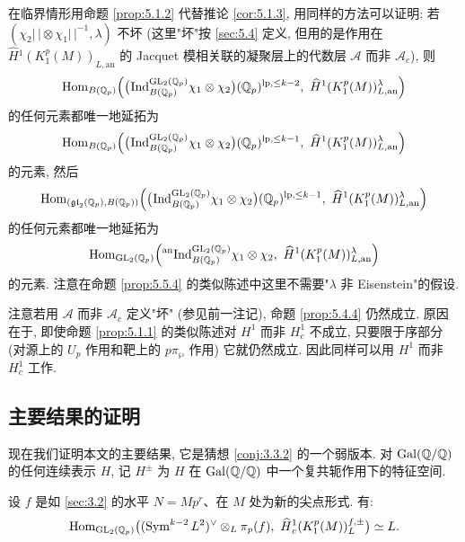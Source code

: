 \begin{remark}\label{rem:5.6.2}
在临界情形用命题 \ref{prop:5.1.2} 代替推论 \ref{cor:5.1.3}, 用同样的方法可以证明: 若 $(\chi_2|\,| \otimes \chi_1|\,|^{-1},\lambda)$ 不坏 (这里"坏"按 \ref{sec:5.4} 定义, 但用的是作用在 $\widehat{H}{}^{1}(K_1^{p}(M))_{L,\mathrm{an}}$ 的 Jacquet 模相关联的凝聚层上的代数层 $\mathcal{A}$ 而非 $\mathcal{A}_c$), 则
\[
\Hom_{B(\Qp)}\Bigl(\bigl(\pind{}_{B(\Qp)}^{\GL_2(\Qp)} \chi_1 \otimes \chi_2\bigr)(\Qp)^{\mathrm{lp},\le k-2},\ \widehat{H}{}^{1}(K_1^{p}(M))_{L,\mathrm{an}}^{\lambda}\Bigr)
\]
的任何元素都唯一地延拓为
\[
\Hom_{B(\Qp)}\Bigl(\bigl(\pind{}_{B(\Qp)}^{\GL_2(\Qp)} \chi_1 \otimes \chi_2\bigr)(\Qp)^{\mathrm{lp},\le k-1},\ \widehat{H}{}^{1}(K_1^{p}(M))_{L,\mathrm{an}}^{\lambda}\Bigr)
\]
的元素, 然后
\[
\Hom_{(\mathfrak{gl}_2(\Qp),B(\Qp))}\Bigl(\bigl(\pind{}_{B(\Qp)}^{\GL_2(\Qp)} \chi_1 \otimes \chi_2\bigr)(\Qp)^{\mathrm{lp},\le k-1},\ \widehat{H}{}^{1}(K_1^{p}(M))_{L,\mathrm{an}}^{\lambda}\Bigr)
\]
的任何元素都唯一地延拓为
\[
\Hom_{\GL_2(\Qp)}\Bigl(\anind_{B(\Qp)}^{\GL_2(\Qp)} \chi_1 \otimes \chi_2,\ \widehat{H}{}^{1}(K_1^{p}(M))_{L,\mathrm{an}}^{\lambda}\Bigr)
\]
的元素.
注意在命题 \ref{prop:5.5.4} 的类似陈述中这里不需要"$\lambda$ 非 Eisenstein"的假设.
\end{remark}

\begin{remark}\label{rem:5.6.3}
注意若用 $\mathcal{A}$ 而非 $\mathcal{A}_c$ 定义"坏" (参见前一注记), 命题 \ref{prop:5.4.4} 仍然成立.
原因在于, 即使命题 \ref{prop:5.1.1} 的类似陈述对 $H^{1}$ 而非 $H_{c}^{1}$ 不成立, 只要限于序部分 (对源上的 $U_p$ 作用和靶上的 $p\pi_{\wp}$ 作用) 它就仍然成立.
因此同样可以用 $H^{1}$ 而非 $H_{c}^{1}$ 工作.
\end{remark}

\subsection{主要结果的证明}

现在我们证明本文的主要结果, 它是猜想 \ref{conj:3.3.2} 的一个弱版本.
对 $\operatorname{Gal}(\mathbb{Q}/\mathbb{Q})$ 的任何连续表示 $H$, 记 $H^{\pm}$ 为 $H$ 在 $\operatorname{Gal}(\mathbb{Q}/\mathbb{Q})$ 中一个复共轭作用下的特征空间.

\begin{lemma}\label{lem:5.7.1}
设 $f$ 是如 \ref{sec:3.2} 的水平 $N = Mp^{r}$、在 $M$ 处为新的尖点形式.
有:
\[
\operatorname{Hom}_{\mathrm{GL}_2(\mathbb{Q}_p)}\bigl((\operatorname{Sym}^{k-2}L^{2})^{\vee} \otimes_L \pi_p(f),\ \widehat{H}{}_{c}^{1}(K_1^{p}(M))_{L}^{f,\pm}\bigr) \simeq L.
\]
\end{lemma}

